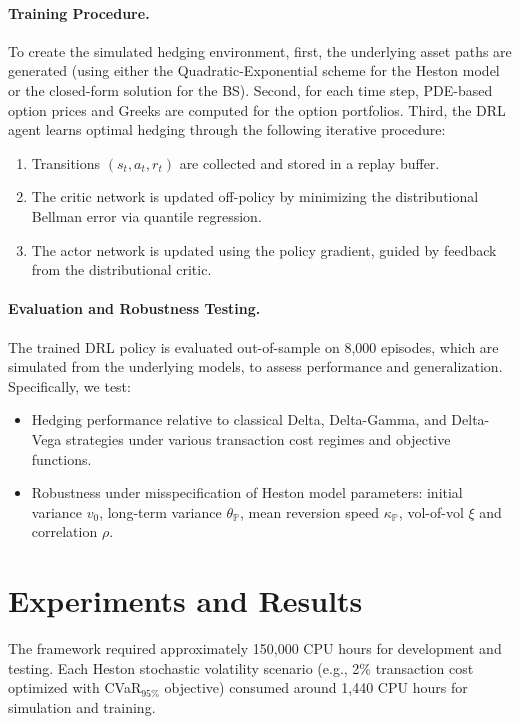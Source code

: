\documentclass[a4paper,fleqn]{cas-dc}
\begin{document}
\paragraph{Training Procedure.} 
To create the simulated hedging environment, first, the underlying asset paths are generated (using either the Quadratic-Exponential scheme for the Heston model or the closed-form solution for the BS). Second, for each time step, PDE-based option prices and Greeks are computed for the option portfolios. Third, the DRL agent learns optimal hedging through the following iterative procedure: 

\begin{enumerate}[noitemsep, left=10pt]
    \item Transitions $(s_t, a_t, r_t)$ are collected and stored in a replay buffer.
    \item The critic network is updated off-policy by minimizing the distributional Bellman error via quantile regression.
    \item The actor network is updated using the policy gradient, guided by feedback from the distributional critic.
\end{enumerate}

\paragraph{Evaluation and Robustness Testing.} 
The trained DRL policy is evaluated out-of-sample on 8,000 episodes, which are simulated from the underlying models, to assess performance and generalization. Specifically, we test:
\begin{itemize}[noitemsep, left=10pt]
    \item Hedging performance relative to classical Delta, Delta-Gamma, and Delta-Vega strategies under various transaction cost regimes and objective functions.
    \item Robustness under misspecification of Heston model parameters: initial variance $v_0$, long-term variance $\theta_{\mathbb{P}}$, mean reversion speed $\kappa_{\mathbb{P}}$, vol-of-vol $\xi$ and correlation $\rho$.
\end{itemize}

\section{Experiments and Results}
\label{sec:experiments}

The framework required approximately 150,000 CPU hours for development and testing. Each Heston stochastic volatility scenario (e.g., 2\% transaction cost optimized with CVaR$_{95\%}$ objective) consumed around 1,440 CPU hours for simulation and training.
\end{document}
